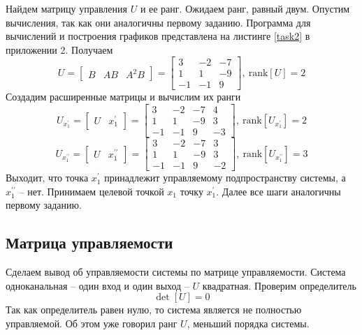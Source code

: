\documentclass[a4paper, 12pt]{article}
\begin{document}
    Найдем матрицу управления $U$ и ее ранг. Ожидаем ранг, равный двум. Опустим вычисления, так как они аналогичны первому заданию. Программа для
    вычислений и построения графиков представлена на листинге \ref{task2} в приложении 2. Получаем
    $$
    U=\begin{bmatrix}
        B &AB &A^2B
    \end{bmatrix}=\begin{bmatrix}
    3    &-2    &-7\\
     1     &1    &-9\\
    -1    &-1     &9
    \end{bmatrix},\ \text{rank}\left[U\right]=2
    $$
    Создадим расширенные матрицы и вычислим их ранги
    $$
    U_{x_1^{\prime}}=\begin{bmatrix}
        U &x_1^{\prime}
    \end{bmatrix}=\begin{bmatrix}
    3    &-2    &-7     &4\\
     1     &1    &-9     &3\\
    -1    &-1     &9    &-3
    \end{bmatrix},\ \text{rank}\left[U_{x_1^{\prime}}\right]=2
    $$
    $$
    U_{x_1^{\prime\prime}}=\begin{bmatrix}
        U &x_1^{\prime\prime}
    \end{bmatrix}=\begin{bmatrix}
    3    &-2    &-7     &3\\
     1     &1    &-9     &3\\
    -1    &-1     &9    &-2
    \end{bmatrix},\ \text{rank}\left[U_{x_1^{\prime\prime}}\right]=3
    $$
    Выходит, что точка $x_1^{\prime}$ принадлежит управляемому подпространству системы, а $x_1^{\prime\prime}$ -- нет.
    Принимаем целевой точкой $x_1$ точку $x_1^{\prime}$. Далее все шаги аналогичны первому заданию.


    \subsection{Матрица управляемости}
    Сделаем вывод об управляемости системы по матрице управляемости.
    Система одноканальная -- один вход и один выход -- $U$ квадратная. Проверим определитель
    $$\det{\left[U\right]}=0$$
    Так как определитель равен нулю, то система является не полностью управляемой.
    Об этом уже говорил ранг $U$, меньший порядка системы.
\end{document}
